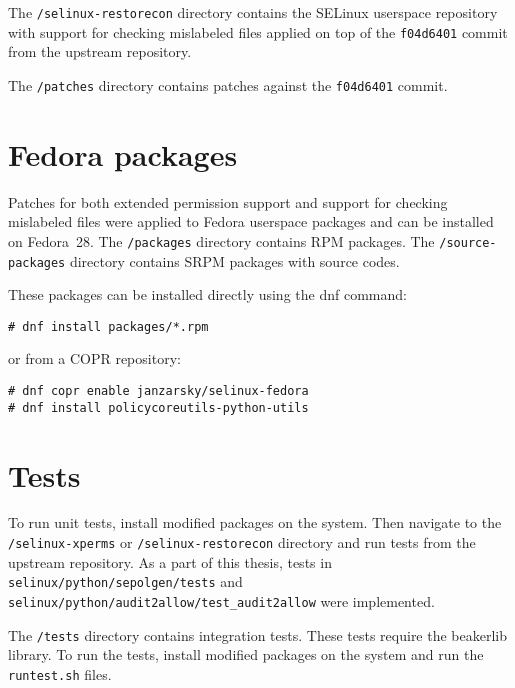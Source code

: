 The \texttt{/selinux-restorecon} directory contains the SELinux userspace
repository with support for checking mislabeled files applied on top of the
\texttt{f04d6401} commit from the upstream repository.

The \texttt{/patches} directory contains patches against the \texttt{f04d6401}
commit.

\section{Fedora packages}

Patches for both extended permission support and support for checking mislabeled
files were applied to Fedora userspace packages and can be installed on
Fedora~28. The \texttt{/packages} directory contains RPM packages. The
\texttt{/source-packages} directory contains SRPM packages with source codes.

These packages can be installed directly using the dnf command:
\begin{lstlisting}
# dnf install packages/*.rpm
\end{lstlisting}
or from a COPR repository:
\begin{lstlisting}
# dnf copr enable janzarsky/selinux-fedora
# dnf install policycoreutils-python-utils
\end{lstlisting}

\section{Tests}
To run unit tests, install modified packages on the system. Then navigate to the
\\ \texttt{/selinux-xperms} or \texttt{/selinux-restorecon} directory and run
tests from the upstream repository. As a part of this thesis, tests in
\texttt{selinux/python/sepolgen/tests} and \\
\texttt{selinux/python/audit2allow/test\_audit2allow} were implemented.

The \texttt{/tests} directory contains integration tests. These tests require
the beakerlib library. To run the tests, install modified packages on the system
and run the \texttt{runtest.sh} files.

